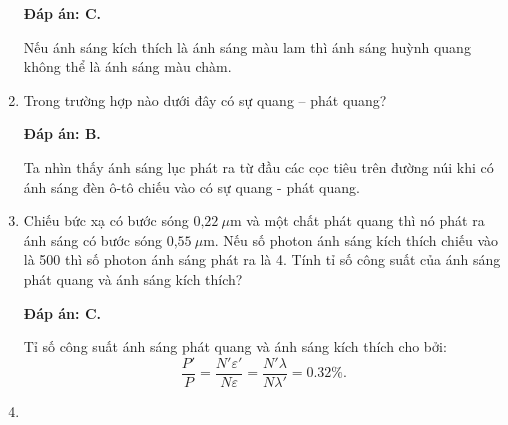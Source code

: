 \begin{enumerate}[label=\bfseries Câu \arabic*:]
	\loigiai
	{		\textbf{Đáp án: C.}
		
Nếu ánh sáng kích thích là ánh sáng màu lam thì ánh sáng huỳnh quang không thể là ánh sáng màu chàm.
		
	}
	
	\item {} 
	
	\cauhoi
	{Trong trường hợp nào dưới đây có sự quang – phát quang?
	}
	
	\loigiai
	{		\textbf{Đáp án: B.}
		
Ta nhìn thấy ánh sáng lục phát ra từ đầu các cọc tiêu trên đường núi khi có ánh sáng đèn ô-tô chiếu vào có sự quang - phát quang. 
		
	}
	
	\item {} 
	
	\cauhoi
	{Chiếu bức xạ có bước sóng $\text{0,22}\ \mu\text{m}$ và một chất phát quang thì nó phát ra ánh sáng có bước sóng $\text{0,55}\ \mu\text{m}$.
	Nếu số photon ánh sáng kích thích chiếu vào là 500 thì số photon ánh sáng phát ra là 4. Tính tỉ số công suất của ánh sáng phát quang và ánh sáng kích thích?
	}
	
	\loigiai
	{		\textbf{Đáp án: C.}
		
Tỉ số công suất ánh sáng phát quang và ánh sáng kích thích cho bởi:
$$
	\dfrac{P'}{P} = \dfrac{N'\varepsilon'}{N\varepsilon} = \dfrac{N' \lambda}{N \lambda'} = \num{0,32} \%.
$$
		
	}
	
	\item {} 
	

\end{enumerate}
